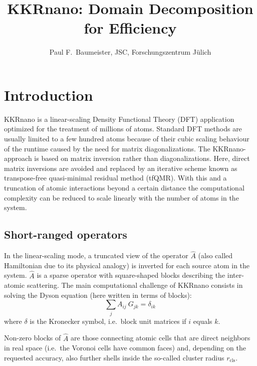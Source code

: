 \documentclass[a4paper]{article}
\newcommand{\um}[1]{_{\mathrm{#1}}}
\begin{document}
\title{KKRnano: Domain Decomposition for Efficiency}
\author{
        Paul F.~Baumeister, JSC, Forschungszentrum J{\"u}lich
        }
\date{}

\maketitle

\section{Introduction} 

KKRnano is a linear-scaling Density Functional Theory (DFT) application
optimized for the treatment of millions of atoms.
Standard DFT methods are usually limited to a few hundred atoms because of
their cubic scaling behaviour of the runtime caused by the need for matrix diagonalizations.
The KKRnano-approach is based on matrix inversion rather than diagonalizations. 
Here, direct matrix inversions are avoided and replaced by
an iterative scheme known as transpose-free quasi-minimal residual method (tfQMR).
With this and a truncation of atomic interactions beyond a certain distance
the computational complexity can be reduced to scale linearly 
with the number of atoms in the system.\cite{zeller_towards_2008,kkrnano:thiess_massively_2012}

\subsection{Short-ranged operators}

In the linear-scaling mode, a truncated view of the operator $\hat A$ 
(also called Hamiltonian due to its physical analogy)
is inverted for each source atom in the system.
$\hat A$ is a sparse operator with square-shaped blocks describing
the inter-atomic scattering.
The main computational challenge of KKRnano consists in solving
the Dyson equation (here written in terms of blocks):
\begin{equation}
 \sum_j A_{ij} \ G_{jk} = \delta_{ik}
\end{equation}
where $\delta$ is the Kronecker symbol, i.e.~block unit matrices if $i$ equals $k$.

Non-zero blocks of $\hat A$ are those connecting atomic cells that are direct neighbors in real space
(i.e.~the Voronoi cells have common faces) and, depending on the requested accuracy,
also further shells inside the so-called cluster radius $r\um{cls}$.
\end{document}
